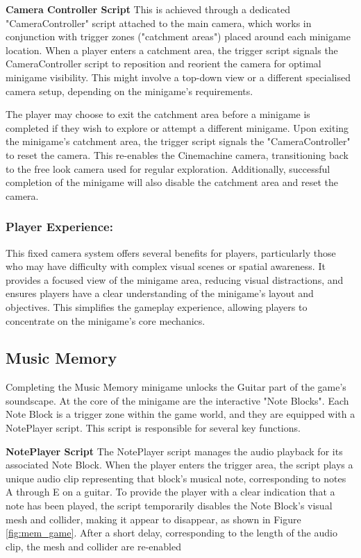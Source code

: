 \documentclass{l4proj}
\begin{document}
\textbf{Camera Controller Script} \newline
This is achieved through a dedicated "CameraController" script attached to the main camera, which works in conjunction with trigger zones ("catchment areas") placed around each minigame location. When a player enters a catchment area, the trigger script signals the CameraController script to reposition and reorient the camera for optimal minigame visibility. This might involve a top-down view or a different specialised camera setup, depending on the minigame's requirements.

The player may choose to exit the catchment area before a minigame is completed if they wish to explore or attempt a different minigame. Upon exiting the minigame's catchment area, the trigger script signals the "CameraController" to reset the camera. This re-enables the Cinemachine camera, transitioning back to the free look camera used for regular exploration. Additionally, successful completion of the minigame will also disable the catchment area and reset the camera.

    
\subsubsection{Player Experience:}
This fixed camera system offers several benefits for players, particularly those who may have difficulty with complex visual scenes or spatial awareness. It provides a focused view of the minigame area, reducing visual distractions, and ensures players have a clear understanding of the minigame's layout and objectives. This simplifies the gameplay experience, allowing players to concentrate on the minigame's core mechanics.

\subsection{Music Memory}
Completing the Music Memory minigame unlocks the Guitar part of the game's soundscape. At the core of the minigame are the interactive "Note Blocks". Each Note Block is a trigger zone within the game world, and they are equipped with a NotePlayer script. This script is responsible for several key functions.
\newline

\textbf{NotePlayer Script} \newline
The NotePlayer script manages the audio playback for its associated Note Block. When the player enters the trigger area, the script plays a unique audio clip representing that block's musical note, corresponding to notes A through E on a guitar. To provide the player with a clear indication that a note has been played, the script temporarily disables the Note Block's visual mesh and collider, making it appear to disappear, as shown in Figure \ref{fig:mem_game}. After a short delay, corresponding to the length of the audio clip, the mesh and collider are re-enabled
\end{document}
